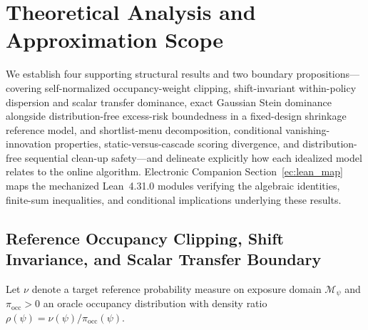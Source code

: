 \section{Theoretical Analysis and Approximation Scope}\label{sec:theory}

We establish four supporting structural results and two boundary propositions—covering self-normalized occupancy-weight clipping, shift-invariant within-policy dispersion and scalar transfer dominance, exact Gaussian Stein dominance alongside distribution-free excess-risk boundedness in a fixed-design shrinkage reference model, and shortlist-menu decomposition, conditional vanishing-innovation properties, static-versus-cascade scoring divergence, and distribution-free sequential clean-up safety—and delineate explicitly how each idealized model relates to the online algorithm. Electronic Companion Section~\ref*{ec:lean_map} maps the mechanized Lean~4.31.0 modules verifying the algebraic identities, finite-sum inequalities, and conditional implications underlying these results.

\subsection{Reference Occupancy Clipping, Shift Invariance, and Scalar Transfer Boundary}

Let $\nu$ denote a target reference probability measure on exposure domain $\mathcal{M}_\psi$ and $\pi_{\mathrm{occ}} > 0$ an oracle occupancy distribution with density ratio $\rho(\psi) = \nu(\psi)/\pi_{\mathrm{occ}}(\psi)$.

